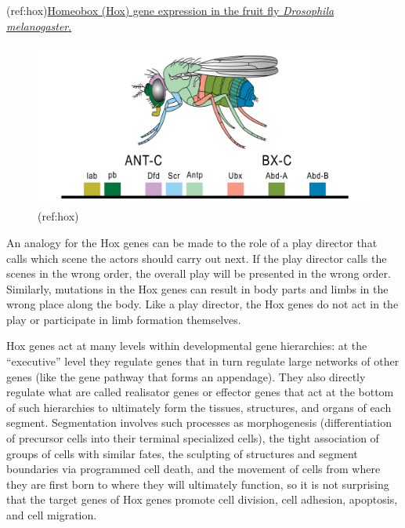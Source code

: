 (ref:hox)\href{https://commons.wikimedia.org/wiki/File:Hoxgenesoffruitfly.svg}{Homeobox (Hox) gene expression in the fruit fly \emph{Drosophila melanogaster}.}

\begin{figure}

{\centering \includegraphics[width=0.7\linewidth]{./figures/development/Hoxgenesoffruitfly} 

}

\caption{(ref:hox)}\label{fig:hoxgene}
\end{figure}

An analogy for the Hox genes can be made to the role of a play director that calls which scene the actors should carry out next. If the play director calls the scenes in the wrong order, the overall play will be presented in the wrong order. Similarly, mutations in the Hox genes can result in body parts and limbs in the wrong place along the body. Like a play director, the Hox genes do not act in the play or participate in limb formation themselves.

Hox genes act at many levels within developmental gene hierarchies: at the ``executive'' level they regulate genes that in turn regulate large networks of other genes (like the gene pathway that forms an appendage). They also directly regulate what are called realisator genes or effector genes that act at the bottom of such hierarchies to ultimately form the tissues, structures, and organs of each segment. Segmentation involves such processes as morphogenesis (differentiation of precursor cells into their terminal specialized cells), the tight association of groups of cells with similar fates, the sculpting of structures and segment boundaries via programmed cell death, and the movement of cells from where they are first born to where they will ultimately function, so it is not surprising that the target genes of Hox genes promote cell division, cell adhesion, apoptosis, and cell migration.


